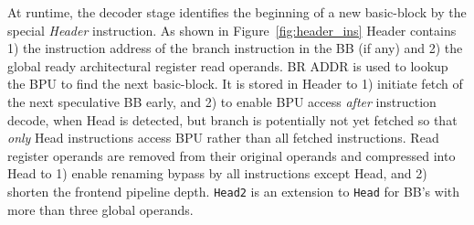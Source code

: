 At runtime, the decoder stage identifies the beginning of a new basic-block by
the special {\it{Header}} instruction. As shown in Figure~\ref{fig:header_ins}
Header contains 1) the instruction address of the branch instruction in the BB
(if any) and 2) the global ready architectural register read operands. BR ADDR
is used to lookup the BPU to find the next basic-block. It is stored in Header
to 1) initiate fetch of the next speculative BB early, and 2) to enable BPU
access {\it{after}} instruction decode, when Head is detected, but branch is
potentially not yet fetched so that {\it{only}} Head instructions access BPU
rather than all fetched instructions. Read register operands are removed from
their original operands and compressed into Head to 1) enable renaming bypass by
all instructions except Head, and 2) shorten the frontend pipeline depth.
\texttt{Head2} is an extension to \texttt{Head} for BB's with more than three
global operands. %


